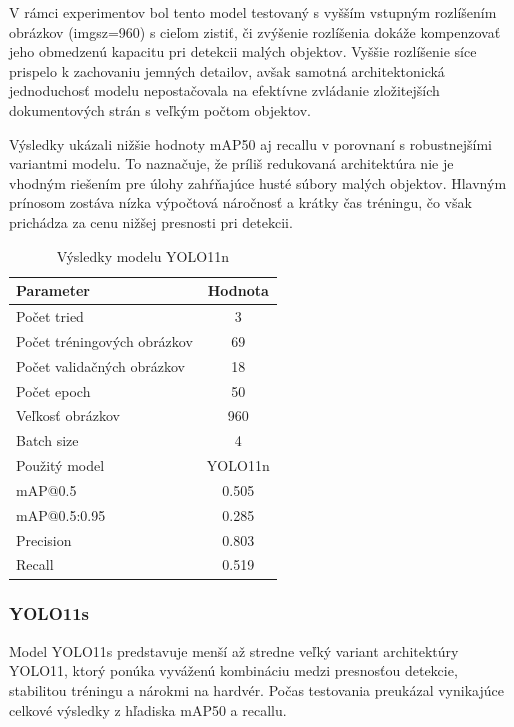             V rámci experimentov bol tento model testovaný s vyšším vstupným rozlíšením obrázkov (imgsz=960) s cieľom zistiť, či zvýšenie rozlíšenia dokáže kompenzovať jeho obmedzenú kapacitu pri detekcii malých objektov. Vyššie rozlíšenie síce prispelo k zachovaniu jemných detailov, avšak samotná architektonická jednoduchosť modelu nepostačovala na efektívne zvládanie zložitejších dokumentových strán s veľkým počtom objektov.

            Výsledky ukázali nižšie hodnoty mAP50 aj recallu v porovnaní s robustnejšími variantmi modelu. To naznačuje, že príliš redukovaná architektúra nie je vhodným riešením pre úlohy zahŕňajúce husté súbory malých objektov. Hlavným prínosom zostáva nízka výpočtová náročnosť a krátky čas tréningu, čo však prichádza za cenu nižšej presnosti pri detekcii.
            \begin{table}[H]
            \centering
            \begin{tabular}{|l|c|}
                \hline
                \textbf{Parameter} & \textbf{Hodnota} \\ \hline
                Počet tried & 3 \\ \hline
                Počet tréningových obrázkov & 69 \\ \hline
                Počet validačných obrázkov & 18 \\ \hline
                Počet epoch & 50 \\ \hline
                Veľkosť obrázkov & 960 \\ \hline
                Batch size & 4 \\ \hline
                Použitý model & YOLO11n \\ \hline
                mAP@0.5 & 0.505 \\ \hline
                mAP@0.5:0.95 & 0.285 \\ \hline
                Precision & 0.803 \\ \hline
                Recall & 0.519 \\ \hline
            \end{tabular}
            \caption{Výsledky modelu YOLO11n}
            \label{tab:yolo11n}
            \end{table}

            \subsubsection{YOLO11s}
            Model YOLO11s predstavuje menší až stredne veľký variant architektúry YOLO11, ktorý ponúka vyváženú kombináciu medzi presnosťou detekcie, stabilitou tréningu a nárokmi na hardvér. Počas testovania preukázal vynikajúce celkové výsledky z hľadiska mAP50 a recallu.

